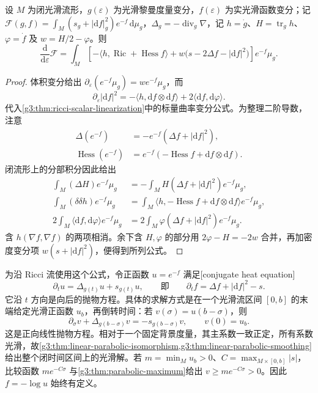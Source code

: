 \begin{lemma}\label{g3:lem:perelman-F-variation}
	设 \(M\) 为闭光滑流形，\(g(\varepsilon)\) 为光滑黎曼度量变分，\(f(\varepsilon)\) 为实光滑函数变分；记 \(\mathcal F(g,f)=\int_M(s_g+|\mathrm df|_g^2)e^{-f}\,\mathrm d\mu_g\)，\(\Delta_g=-\operatorname{div}_g\nabla\)，记 \(h=\dot g\)、\(H=\operatorname{tr}_g h\)、\(\varphi=\dot f\) 及 \(w=H/2-\varphi\)。则
	\begin{equation}\label{g3:eq:perelman-F-variation}
		\frac{\mathrm d}{\mathrm d\varepsilon}\mathcal F
		=\int_M\left[-\langle h,\operatorname{Ric}+\operatorname{Hess}f\rangle
		+w\bigl(s-2\Delta f-|\mathrm df|^2\bigr)\right]e^{-f}\mu_g.
	\end{equation}
\end{lemma}
\begin{proof}
	体积变分给出 \(\partial_\varepsilon(e^{-f}\mu_g)=we^{-f}\mu_g\)，而
	\[
		\partial_\varepsilon|\mathrm df|^2
		=-\langle h,\mathrm df\otimes\mathrm df\rangle
		+2\langle\mathrm df,\mathrm d\varphi\rangle.
	\]
	代入\cref{g3:thm:ricci-scalar-linearization}中的标量曲率变分公式。为整理二阶导数，注意
	\[
		\begin{aligned}
		\Delta(e^{-f})&=-e^{-f}(\Delta f+|\mathrm df|^2),\\
		\operatorname{Hess}(e^{-f})
		&=e^{-f}(-\operatorname{Hess}f+\mathrm df\otimes\mathrm df).
		\end{aligned}
	\]
	闭流形上的分部积分因此给出
	\[
		\begin{aligned}
		\int_M(\Delta H)e^{-f}\mu_g
		&=-\int_MH(\Delta f+|\mathrm df|^2)e^{-f}\mu_g,\\
		\int_M(\delta\delta h)e^{-f}\mu_g
		&=\int_M\langle h,-\operatorname{Hess}f+\mathrm df\otimes\mathrm df\rangle e^{-f}\mu_g,\\
		2\int_M\langle\mathrm df,\mathrm d\varphi\rangle e^{-f}\mu_g
		&=2\int_M\varphi(\Delta f+|\mathrm df|^2)e^{-f}\mu_g.
		\end{aligned}
	\]
	含 \(h(\nabla f,\nabla f)\) 的两项相消。余下含 \(H,\varphi\) 的部分用 \(2\varphi-H=-2w\) 合并，再加密度变分项 \(w(s+|\mathrm df|^2)\)，便得到所列公式。
\end{proof}

为沿 Ricci 流使用这个公式，令正函数 \(u=e^{-f}\) 满足[conjugate heat equation]
\begin{equation}\label{g3:eq:ricci-conjugate-heat}
	\partial_tu=\Delta_{g(t)}u+s_{g(t)}u,
	\qquad\text{即}\qquad
	\partial_tf=\Delta f+|\mathrm df|^2-s.
\end{equation}
它沿 \(t\) 方向是向后的抛物方程。具体的求解方式是在一个光滑流区间 \([0,b]\) 的末端给定光滑正函数 \(u_b\)，再倒转时间：若 \(v(\sigma)=u(b-\sigma)\)，则
\[
	\partial_\sigma v+\Delta_{g(b-\sigma)}v
	=-s_{g(b-\sigma)}v,\qquad v(0)=u_b.
\]
这是正向线性抛物方程。相对于一个固定背景度量，其主系数一致正定，所有系数光滑，故\cref{g3:thm:linear-parabolic-isomorphism,g3:thm:linear-parabolic-smoothing}给出整个闭时间区间上的光滑解。若 \(m=\min_Mu_b>0\)、\(C=\max_{M\times[0,b]}|s|\)，比较函数 \(me^{-C\sigma}\) 与\cref{g3:thm:parabolic-maximum}给出 \(v\ge me^{-C\sigma}>0\)。因此 \(f=-\log u\) 始终有定义。


